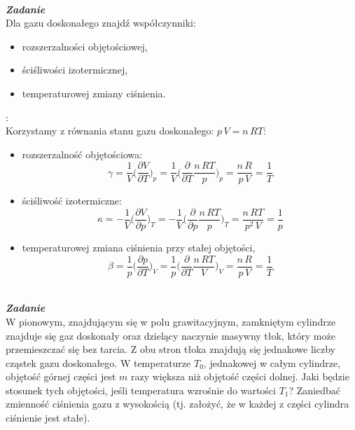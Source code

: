 \documentclass[11pt,a4paper]{article}
\newcounter{zadanie}\newcommand{\zadanie}[1][]{\addtocounter{zadanie}{1} ~\\  {\bf \emph{Zadanie \arabic{zadanie} #1 }} \\}
\begin{document}
\clearpage

\zadanie
Dla gazu doskonałego znajdź współczynniki:
\begin{itemize}
\item[1.] rozszerzalności objętościowej,
\item[2.] ściśliwości izotermicznej,
\item[3.] temperaturowej zmiany ciśnienia.
\end{itemize}

\vspace{2mm}{\bf Rozwiązanie}:\\
Korzystamy z równania stanu gazu doskonałego: $p\,V = n\,RT$:

\begin{itemize}
\item[1.] rozszerzalność objętościowa:
 \[
  \gamma = \frac{1}{V}\bigg(\frac{\partial V}{\partial T}\bigg)_p = 
  \frac{1}{V}\bigg(\frac{\partial}{\partial T}\frac{n\,RT}{p}\bigg)_p = \frac{n\,R}{p\,V}=\frac{1}{T}
 \]
\item[2.] ściśliwość izotermiczne:
 \[
  \kappa = -\frac{1}{V}\bigg(\frac{\partial V}{\partial p}\bigg)_T =
  -\frac{1}{V}\bigg(\frac{\partial}{\partial p}\frac{n\,RT}{p}\bigg)_T = \frac{n\,RT}{p^2\,V} = \frac{1}{p}
 \]
\item[3.] temperaturowej zmiana ciśnienia przy stałej objętości,
 \[
  \beta = \frac{1}{p}\bigg(\frac{\partial p}{\partial T}\bigg)_V =
  \frac{1}{p}\bigg(\frac{\partial}{\partial T}\frac{n\,RT}{V}\bigg)_V = \frac{n\,R}{p\,V} = \frac{1}{T}
 \]
\end{itemize}

\clearpage

\zadanie
W pionowym, znajdującym się w polu grawitacyjnym, zamkniętym cylindrze znajduje się gaz doskonały oraz dzielący naczynie masywny tłok, który może przemieszczać się bez tarcia. Z obu stron tłoka znajdują się jednakowe liczby cząstek gazu doskonałego. W temperaturze $T_0$, jednakowej w całym cylindrze, objętość górnej części jest $m$ razy większa niż objętość części dolnej. Jaki będzie stosunek tych objętości, jeśli temperatura wzrośnie do wartości $T_1$? Zaniedbać zmienność ciśnienia gazu z wysokością (tj. założyć, że w każdej z części cylindra ciśnienie jest stałe).
\end{document}
